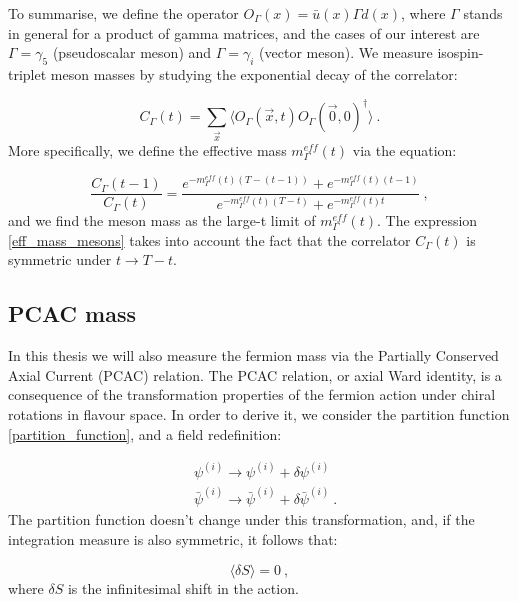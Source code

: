 To summarise, we define the operator $O_{\Gamma}(x) = \bar u(x) \Gamma d(x) $, where $\Gamma$ stands in general for a product of gamma matrices, and the cases of our interest are $\Gamma =\gamma_5$ (pseudoscalar meson) and $\Gamma = \gamma_i$ (vector meson). We measure isospin-triplet meson masses by studying the exponential decay of the correlator:

\begin{equation}
C_{\Gamma}(t) = \sum_{\vec x} \langle O_{\Gamma}(\vec x,t) O_{\Gamma} (\vec 0, 0)^{\dagger} \rangle \: .
\label{meson_correlator}
\end{equation}
%
More specifically, we define the effective mass $m^{eff}_{\Gamma}(t)$ via the equation:

\begin{equation}
\frac{C_{\Gamma}(t-1)}{C_{\Gamma}(t)} = \frac{e^{-m^{eff}_{\Gamma}(t)(T-(t-1))} + e^{-m^{eff}_{\Gamma}(t)(t-1)}}{e^{-m^{eff}_{\Gamma}(t)(T-t)} + e^{-m^{eff}_{\Gamma}(t)t}} \: ,
\label{eff_mass_mesons}
\end{equation}
%
and we find the meson mass as the large-t limit of $m^{eff}_{\Gamma}(t)$. The expression \ref{eff_mass_mesons} takes into account the fact that the correlator $C_{\Gamma}(t)$ is symmetric under $t \to T-t$.


\subsection{PCAC mass}

In this thesis we will also measure the fermion mass via the Partially Conserved Axial Current (PCAC) relation.
The PCAC relation, or axial Ward identity, is a consequence of the transformation properties of the fermion action under chiral rotations in flavour space. In order to derive it, we consider the partition function \ref{partition_function}, and a field redefinition:

\begin{equation}
\begin{split}
& \psi^{(i)} \to \psi^{(i)} + \delta \psi^{(i)} \\
& \bar \psi^{(i)} \to \bar \psi^{(i)} +  \delta \bar\psi^{(i)} \: .
\end{split}
\end{equation}
%
The partition function doesn't change under this transformation, and, if the integration measure is also symmetric, it follows that:

\begin{equation}
\langle \delta S \rangle = 0 \: ,
\label{Ward_id}
\end{equation}
%
where $\delta S$ is the infinitesimal shift in the action.

